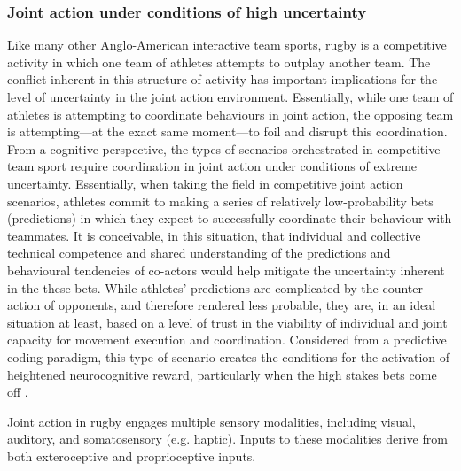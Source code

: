 \begin{CJK}{UTF8}{gbsn}
\subsubsection{Joint action under conditions of high uncertainty}
Like many other Anglo-American interactive team sports, rugby is a competitive activity in which one team of athletes attempts to outplay another team.  The conflict inherent in this structure of activity has important implications for the level of uncertainty in the joint action environment.  Essentially, while one team of athletes is attempting to coordinate behaviours in joint action, the opposing team is attempting---at the exact same moment---to foil and disrupt this coordination.  From a cognitive perspective, the types of scenarios orchestrated in competitive team sport require coordination in joint action under conditions of extreme uncertainty.  Essentially, when taking the field in competitive joint action scenarios, athletes commit to making a series of relatively low-probability bets (predictions) in which they expect to successfully coordinate their behaviour with teammates.  It is conceivable, in this situation, that individual and collective technical competence and shared understanding of the predictions and behavioural tendencies of co-actors would help mitigate the uncertainty inherent in the these bets.  While athletes' predictions are complicated by the counter-action of opponents, and therefore rendered less probable, they are, in an ideal situation at least, based on a level of trust in the viability of individual and joint capacity for movement execution and coordination.  Considered from a predictive coding paradigm, this type of scenario creates the conditions for the activation of heightened neurocognitive reward, particularly when the high stakes bets come off \citep{Chetverikov2016}.


Joint action in rugby engages multiple sensory modalities, including visual, auditory, and somatosensory (e.g. haptic).  Inputs to these modalities derive from both exteroceptive and proprioceptive inputs.


\end{CJK}

